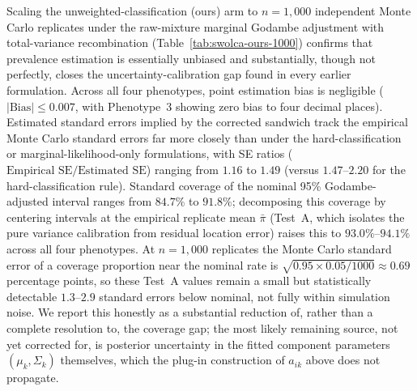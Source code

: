 \documentclass[11pt]{article}
\begin{document}
Scaling the unweighted-classification (ours) arm to $n = 1{,}000$ independent Monte Carlo replicates under the raw-mixture marginal Godambe adjustment with total-variance recombination (Table~\ref{tab:swolca-ours-1000}) confirms that prevalence estimation is essentially unbiased and substantially, though not perfectly, closes the uncertainty-calibration gap found in every earlier formulation. Across all four phenotypes, point estimation bias is negligible ($|\text{Bias}| \le 0.007$, with Phenotype~3 showing zero bias to four decimal places). Estimated standard errors implied by the corrected sandwich track the empirical Monte Carlo standard errors far more closely than under the hard-classification or marginal-likelihood-only formulations, with SE ratios ($\text{Empirical SE} / \text{Estimated SE}$) ranging from $1.16$ to $1.49$ (versus $1.47$--$2.20$ for the hard-classification rule). Standard coverage of the nominal 95\% Godambe-adjusted interval ranges from $84.7\%$ to $91.8\%$; decomposing this coverage by centering intervals at the empirical replicate mean $\bar\pi$ (Test~A, which isolates the pure variance calibration from residual location error) raises this to $93.0\%$--$94.1\%$ across all four phenotypes. At $n=1{,}000$ replicates the Monte Carlo standard error of a coverage proportion near the nominal rate is $\sqrt{0.95 \times 0.05 / 1000} \approx 0.69$ percentage points, so these Test~A values remain a small but statistically detectable $1.3$--$2.9$ standard errors below nominal, not fully within simulation noise. We report this honestly as a substantial reduction of, rather than a complete resolution to, the coverage gap; the most likely remaining source, not yet corrected for, is posterior uncertainty in the fitted component parameters $(\mu_k, \Sigma_k)$ themselves, which the plug-in construction of $a_{ik}$ above does not propagate.

\begin{table}[h]
\centering
\small
{}
\caption{Validation results for the survey-weighted DPMM with raw-mixture marginal Godambe adjustment ($n=1{,}000$ Monte Carlo replicates). SE Ratio is Empirical~SE / Estimated~SE; Centered Coverage evaluates the nominal 95\% interval centered at the empirical mean $\bar\pi$ to isolate variance calibration from residual finite-sample location error.}
\label{tab:swolca-ours-1000}
\end{table}
\end{document}
